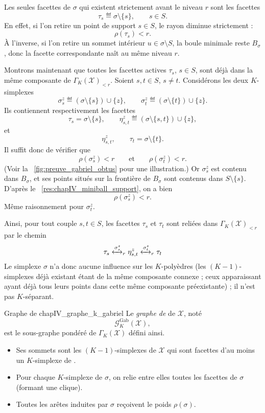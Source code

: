 \begin{Preuve}
Les seules facettes de $\sigma$ qui existent strictement avant le niveau $r$ sont les facettes
\[
    \tau_s\eqdef\sigma\setminus\{s\},
    \qquad s\in S.
\]
En effet, si l'on retire un point de support $s\in S$, le rayon diminue strictement :
\[
    \rho(\tau_s)<r.
\]
À l'inverse, si l'on retire un sommet intérieur $u\in\sigma\setminus S$, la boule minimale reste $B_\sigma$, donc la facette correspondante naît au même niveau $r$.

Montrons maintenant que toutes les facettes actives $\tau_s$, $s\in S$, sont déjà dans la même composante de $\Gamma_K(\mathcal X)_{<r}$.
Soient $s,t\in S$, $s\neq t$. Considérons les deux $K$-simplexes
\[
    \sigma_s^z\eqdef(\sigma\setminus\{s\})\cup\{z\},
    \qquad
    \sigma_t^z\eqdef(\sigma\setminus\{t\})\cup\{z\}.
\]
Ils contiennent respectivement les facettes
\[
    \tau_s=\sigma\setminus\{s\},
    \qquad
    \eta_{s,t}^z\eqdef(\sigma\setminus\{s,t\})\cup\{z\},
\]
et
\[
    \eta_{s,t}^z,
    \qquad
    \tau_t=\sigma\setminus\{t\}.
\]
Il suffit donc de vérifier que
\[
    \rho(\sigma_s^z)<r
    \qquad\text{et}\qquad
    \rho(\sigma_t^z)<r.
\]
(Voir la \Fig~\ref{fig:preuve_gabriel_obtus} pour une illustration.)
Or $\sigma_s^z$ est contenu dans $B_\sigma$, et ses points situés sur la frontière de $B_\sigma$ sont contenus dans $S\setminus\{s\}$. D'après le \Res~\ref{res:chapIV_miniball_support}, on a bien
\[
\rho(\sigma_s^z)<r.
\]
Même raisonnement pour $\sigma_t^z$.

Ainsi, pour tout couple $s,t\in S$, les facettes $\tau_s$ et $\tau_t$ sont reliées dans $ \Gamma_K(\mathcal X)_{<r}$ par le chemin
\[
    \tau_s \xleftrightarrow{\sigma_s^z}_r \eta_{s,t}^z \xleftrightarrow{\sigma_t^z}_r \tau_t
\]
Le simplexe $\sigma$ n'a donc aucune influence sur les $K$-polyèdres (les $(K-1)$-simplexes déjà existant étant de la même composante connexe ; ceux apparaissant ayant déjà tous leurs points dans cette même composante préexistante) ; il n'est pas $K$-séparant.
\end{Preuve}

\begin{Definition}{Graphe de }{chapIV_graphe_k_gabriel}
Le \emph{graphe de } de $\mathcal X$, noté
\[
\boxed{
    \mathcal G_K^{\mathrm{Gab}}(\mathcal X),
    }
\]
est le sous-graphe pondéré de $\Gamma_K(\mathcal X)$ défini ainsi.
\begin{itemize}
    \item Ses sommets sont les $(K-1)$-simplexes de $\mathcal X$ qui sont facettes d'au moins un $K$-simplexe de .
    \item Pour chaque $K$-simplexe de  $\sigma$, on relie entre elles toutes les facettes de $\sigma$ (formant une clique).
    \item Toutes les arêtes induites par $\sigma$ reçoivent le poids $\rho(\sigma)$.
\end{itemize}
\end{Definition}

